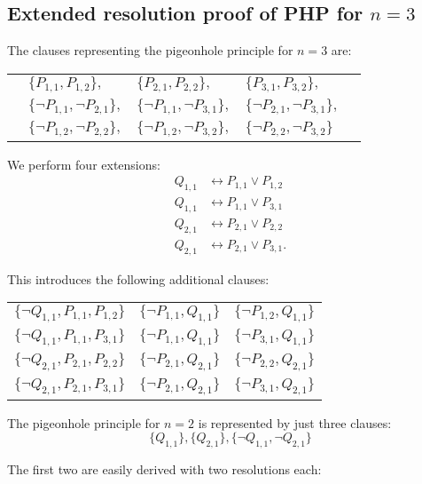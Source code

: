 \begin{appendices}

\section{Extended resolution proof of PHP for $n=3$}

The clauses representing the pigeonhole principle for $n=3$ are:

\begin{tabular}{rllll}
   & $\{P_{1,1}, P_{1,2}\},$ & $\{P_{2,1}, P_{2,2}\},$ & $\{P_{3,1}, P_{3,2}\},$ & \\
  & $\{\neg P_{1,1}, \neg P_{2,1}\},$ & $\{\neg P_{1,1}, \neg P_{3,1}\},$ & $\{\neg P_{2,1}, \neg P_{3,1}\},$ & \\
  & $\{\neg P_{1,2}, \neg P_{2,2}\},$ & $\{\neg P_{1,2}, \neg P_{3,2}\},$ & $\{\neg P_{2,2}, \neg P_{3,2}\}$ &
\end{tabular}

We perform four extensions:
\begin{equation*}
  \begin{align*}
    Q_{1,1} &\leftrightarrow P_{1,1} \vee P_{1,2} \\
    Q_{1,1} &\leftrightarrow P_{1,1} \vee P_{3,1} \\
    Q_{2,1} &\leftrightarrow P_{2,1} \vee P_{2,2} \\
    Q_{2,1} &\leftrightarrow P_{2,1} \vee P_{3,1}.
  \end{align*}
\end{equation*}

This introduces the following additional clauses:

\begin{tabular}{lll}
  $\{\neg Q_{1,1}, P_{1,1}, P_{1,2}\}$ &
  $\{\neg P_{1,1}, Q_{1,1}\}$ &
  $\{\neg P_{1,2}, Q_{1,1}\}$ \\
  $\{\neg Q_{1,1}, P_{1,1}, P_{3,1}\}$ &
  $\{\neg P_{1,1}, Q_{1,1}\}$ &
  $\{\neg P_{3,1}, Q_{1,1}\}$ \\
  $\{\neg Q_{2,1}, P_{2,1}, P_{2,2}\}$ &
  $\{\neg P_{2,1}, Q_{2,1}\}$ &
  $\{\neg P_{2,2}, Q_{2,1}\}$ \\
  $\{\neg Q_{2,1}, P_{2,1}, P_{3,1}\}$ &
  $\{\neg P_{2,1}, Q_{2,1}\}$ &
  $\{\neg P_{3,1}, Q_{2,1}\}$
\end{tabular}

The pigeonhole principle for $n=2$ is represented by just three clauses:
\[\{Q_{1,1}\}, \{Q_{2,1}\}, \{\neg Q_{1,1}, \neg Q_{2,1}\}\]

The first two are easily derived with two resolutions each:


\end{appendices}
